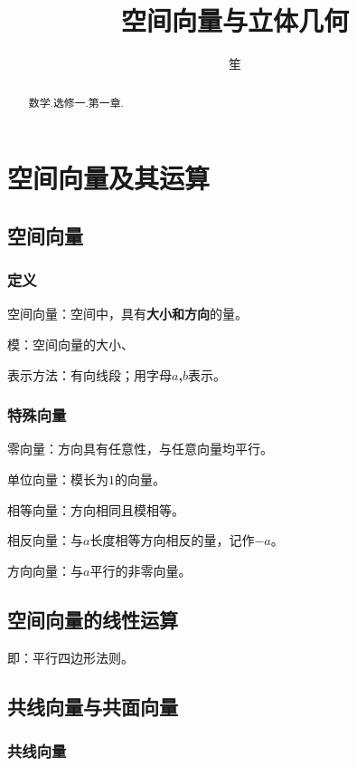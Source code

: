 \documentclass{ctexart}
\title{空间向量与立体几何}
\author{笙}
\begin{document}
\tableofcontents
\maketitle


\begin{abstract}
数学.选修一.第一章.
\end{abstract}

\section{空间向量及其运算}

\subsection{空间向量}

\subsubsection{定义}

空间向量：空间中，具有\textbf{大小和方向}的量。

模：空间向量的大小、

表示方法：有向线段；用字母\textbf{$a$,$b$}表示。

\subsubsection{特殊向量}

零向量：方向具有任意性，与任意向量均平行。

单位向量：模长为$1$的向量。

相等向量：方向相同且模相等。

相反向量：与\textbf{$a$}长度相等方向相反的量，记作\textbf{$-a$}。

方向向量：与\textbf{$a$}平行的非零向量。

\subsection{空间向量的线性运算}

即：平行四边形法则。

\subsection{共线向量与共面向量}

\subsubsection{共线向量}
\end{document}
